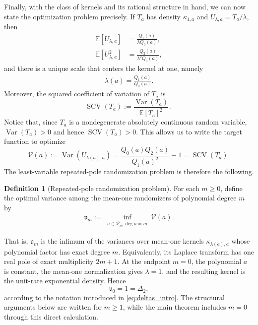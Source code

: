 \documentclass[11pt]{article}
\numberwithin{equation}{section}
\theoremstyle{definition}
\newtheorem{definition}[theorem]{Definition}
\theoremstyle{remark}
\newcommand{\E}{\mathbb E}
\newcommand{\Var}{\operatorname{Var}}
\newcommand{\SCV}{\operatorname{SCV}}
\newcommand{\Pcal}{\mathcal P}
\newcommand{\Vcal}{\mathcal V}
\begin{document}
Finally, with the class of kernels and its rational structure in hand, we can now
state the optimization problem precisely. If $T_a$ has density $\kappa_{1,a}$
and $U_{\lambda,a}=T_a/\lambda$, then
\begin{align}
\label{num:eq:mean}
    \E[U_{\lambda,a}]
    &=\frac{Q_1(a)}{\lambda Q_0(a)},\\
 \label{num:eq:second}
    \E[U_{\lambda,a}^2]
    &=\frac{Q_2(a)}{\lambda^2Q_0(a)},
\end{align}
and there is a unique scale that centers the kernel at one, namely
\begin{align*}
    \lambda(a)=\frac{Q_1(a)}{Q_0(a)}.
\end{align*}
Moreover, the squared coefficient of variation of $T_a$ is
\begin{equation}
\label{eq:scv}
  \SCV(T_a):=\frac{\Var(T_a)}{\E[T_a]^2}\mathpunct{{.}}  
\end{equation}
Notice that, since $T_a$ is a nondegenerate absolutely continuous random variable, $\Var(T_a)>0$ and hence $\SCV(T_a)>0$. This allows us to write the target function to optimize 
\begin{equation}
\label{eq:obj_scv}
    \Vcal(a)
    :=\Var(U_{\lambda(a),a})
    =\frac{Q_0(a)Q_2(a)}{Q_1(a)^2}-1
    =\SCV(T_a).
\end{equation}
The least-variable repeated-pole randomization problem is therefore the
following.

\begin{definition}[Repeated-pole randomization problem]
\label{aw:def}
For each $m\geq0$, define the optimal variance among the mean-one
randomizers of polynomial degree $m$ by
\begin{align*}
\mathfrak v_m
:=
\inf_{\substack{a\in\Pcal_m\ \deg a=m}}
\Vcal(a).
\end{align*}
\end{definition}
That is, $\mathfrak v_m$ is the infimum of the variances over
mean-one kernels $\kappa_{\lambda(a),a}$ whose polynomial factor has exact
degree $m$. Equivalently, its Laplace transform has one real pole of exact
multiplicity $2m+1$.
At the endpoint $m=0$, the polynomial $a$ is constant, the mean-one
normalization gives $\lambda=1$, and the resulting kernel is the unit-rate
exponential density. Hence 
\begin{equation}
\label{eq:case_m0}
    \mathfrak v_0=1=\Delta_2,
\end{equation}
according to the notation introduced in \eqref{eq:deltas_intro}.
The structural arguments below are written for $m\geq1$, while the main
theorem includes $m=0$ through this direct calculation.
\end{document}
